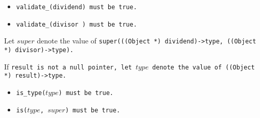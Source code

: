 \begin{itemize}

\item \tt{validate_(dividend)} must be \tt{true}.

\item \tt{validate_(divisor )} must be \tt{true}.

\end{itemize}

Let $super$ denote the value of
\tt{super(((Object *) dividend)->type, ((Object *) divisor)->type)}.

If \tt{result} is not a null pointer, let $type$
denote the value of \tt{((Object *) result)->type}.

\begin{itemize}

\item \tt{is_type(}$type$\tt{)} must be \tt{true}.

\item \tt{is(}$type$\tt{,} $super$\tt{)} must be \tt{true}.

\end{itemize}
